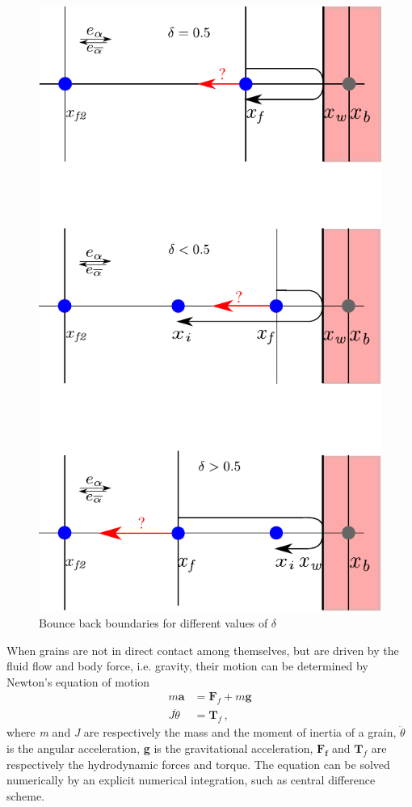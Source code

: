 \begin{figure}[htbp]
\centering
\includegraphics[height=0.9\textheight]{bouncemod}
\caption{Bounce back boundaries for different values of $\delta$}
\label{fig:bouncemod}
\end{figure}

When grains are not in direct contact among themselves, but are driven by 
the fluid flow and body force, i.e. gravity, their motion can be determined by 
Newton's equation of motion
%
\begin{align}
\mathit{m}\mathbf{ a} & = \mathbf{F}_{f} + \mathit{m }\mathbf{g} \\
\mathit{J } \ddot{\theta} & = \mathbf{T}_{f} \,,
\end{align}
%
\noindent where \textit{m} and \textit{J} are respectively the mass and the 
moment of inertia of a grain, $\ddot{\theta}$ is the 
angular acceleration, \textbf{g} is the gravitational acceleration,
$\mathbf{F_f}$ and $\mathbf{T}_{f}$ are respectively the hydrodynamic forces 
and torque. The equation can be solved numerically by an explicit numerical 
integration, such as central difference scheme. 

